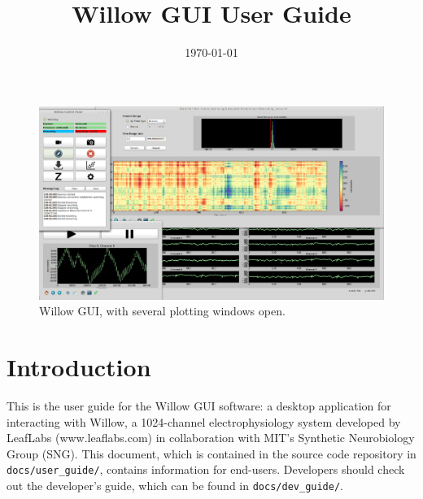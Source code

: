 % 


\usepackage{bm}

\title{Willow GUI User Guide}
\date{\today}


\maketitle


\begin{figure}[h!]
\begin{center}
\includegraphics[width=15cm]{screenshots/gui_windowtiling.png}
\end{center}
\caption{Willow GUI, with several plotting windows open.}
\label{fig_sw}
\end{figure}

\section{Introduction}
\label{sec_intro}

This is the user guide for the Willow GUI software: a desktop application for interacting with Willow, a 1024-channel electrophysiology system developed by LeafLabs (www.leaflabs.com) in collaboration with MIT's Synthetic Neurobiology Group (SNG). This document, which is contained in the source code repository in \texttt{docs/user\_guide/}, contains information for end-users. Developers should check out the developer's guide, which can be found in \texttt{docs/dev\_guide/}.


